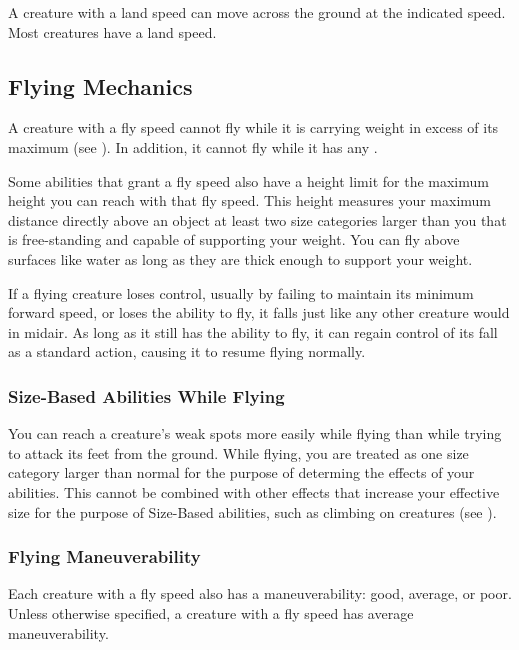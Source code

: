         A creature with a land speed can move across the ground at the indicated speed.
        Most creatures have a land speed.

    \subsection{Flying Mechanics}\label{Flying Mechanics}
        A creature with a fly speed cannot fly while it is carrying weight in excess of its maximum  (see ).
        In addition, it cannot fly while it has any .

         Some abilities that grant a fly speed also have a height limit for the maximum height you can reach with that fly speed.
        This height measures your maximum distance directly above an object at least two size categories larger than you that is free-standing and capable of supporting your weight.
        You can fly above surfaces like water as long as they are thick enough to support your weight.

         If a flying creature loses control, usually by failing to maintain its minimum forward speed, or loses the ability to fly, it falls just like any other creature would in midair. As long as it still has the ability to fly, it can regain control of its fall as a standard action, causing it to resume flying normally.

        \subsubsection{Size-Based Abilities While Flying}
            You can reach a creature's weak spots more easily while flying than while trying to attack its feet from the ground.
            While flying, you are treated as one size category larger than normal for the purpose of determing the effects of your  abilities.
            This cannot be combined with other effects that increase your effective size for the purpose of Size-Based abilities, such as climbing on creatures (see ).

        \subsubsection{Flying Maneuverability}\label{Flying Maneuverability}
        Each creature with a fly speed also has a maneuverability: good, average, or poor.
        Unless otherwise specified, a creature with a fly speed has average maneuverability.

